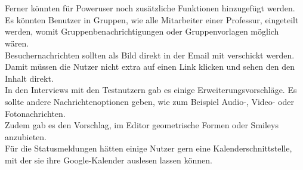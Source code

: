 % 
% 
% 
\\
\\
Ferner könnten für Poweruser noch zusätzliche Funktionen hinzugefügt werden.
\\
Es könnten Benutzer in Gruppen, wie \bspw alle Mitarbeiter einer Professur, eingeteilt werden, womit Gruppenbenachrichtigungen oder Gruppenvorlagen möglich wären.
\\
Besuchernachrichten sollten als Bild direkt in der Email mit verschickt werden.
Damit müssen die Nutzer nicht extra auf einen Link klicken und sehen den den Inhalt direkt.
\\
In den Interviews mit den Testnutzern gab es einige Erweiterungsvorschläge.
Es sollte andere Nachrichtenoptionen geben, wie zum Beispiel Audio-, Video- oder Fotonachrichten.
\\
Zudem gab es den Vorschlag, im Editor geometrische Formen oder Smileys anzubieten.
\\
Für die Statusmeldungen hätten einige Nutzer gern eine Kalenderschnittstelle, mit der sie ihre Google-Kalender auslesen lassen können.
% 
% 
% 
% 
